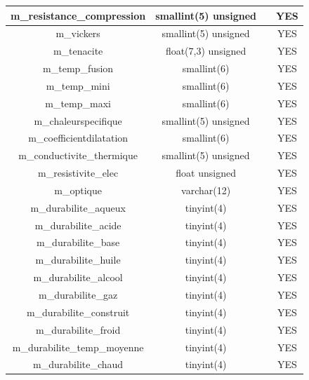 \documentclass[12pt,a4paper]{article}
\begin{document}
\begin{table}
\begin{center}
\begin{tabular}{|c|c|c|c|}
                \hline
                m\_resistance\_compression & smallint(5) unsigned &  & YES \\
                \hline
                m\_vickers & smallint(5) unsigned &  & YES \\
                \hline
                m\_tenacite & float(7,3) unsigned &  & YES \\
                \hline
                m\_temp\_fusion & smallint(6) &  & YES \\
                \hline
                m\_temp\_mini & smallint(6) &  & YES \\
                \hline
                m\_temp\_maxi & smallint(6) &  & YES \\
                \hline
                m\_chaleurspecifique & smallint(5) unsigned &  & YES \\
                \hline
                m\_coefficientdilatation & smallint(6) &  & YES \\
                \hline
                m\_conductivite\_thermique & smallint(5) unsigned &  & YES \\
                \hline
                m\_resistivite\_elec & float unsigned &  & YES \\
                \hline
                m\_optique & varchar(12) &  & YES \\
                \hline
                m\_durabilite\_aqueux & tinyint(4) &  & YES \\
                \hline
                m\_durabilite\_acide & tinyint(4) &  & YES \\
                \hline
                m\_durabilite\_base & tinyint(4) &  & YES \\
                \hline
                m\_durabilite\_huile & tinyint(4) &  & YES \\
                \hline
                m\_durabilite\_alcool & tinyint(4) &  & YES \\
                \hline
                m\_durabilite\_gaz & tinyint(4) &  & YES \\
                \hline
                m\_durabilite\_construit & tinyint(4) &  & YES \\
                \hline
                m\_durabilite\_froid & tinyint(4) &  & YES \\
                \hline
                m\_durabilite\_temp\_moyenne & tinyint(4) &  & YES \\
                \hline
                m\_durabilite\_chaud & tinyint(4) &  & YES \\

\end{tabular}
\end{center}
\end{table}
\end{document}
